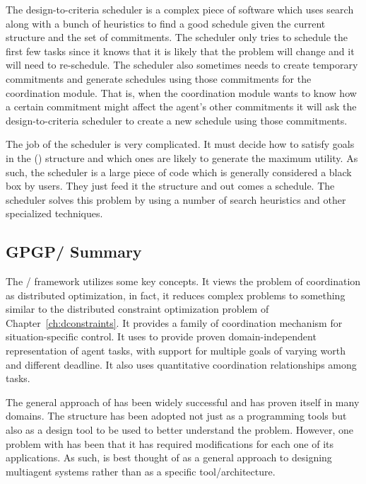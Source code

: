 The design-to-criteria scheduler is a complex piece of software which
uses search along with a bunch of heuristics to find a good schedule
given the current \taems{} structure and the set of commitments. The
scheduler only tries to schedule the first few tasks since it knows
that it is likely that the problem will change and it will need to
re-schedule. The scheduler also sometimes needs to create temporary
commitments and generate schedules using those commitments for the
 coordination module. That is, when the  coordination module
wants to know how a certain commitment might affect the agent's other
commitments it will ask the design-to-criteria scheduler to create a
new schedule using those commitments. 

The job of the scheduler is very complicated. It must decide how to
satisfy goals in the \taems() structure and which ones are likely to
generate the maximum utility. As such, the scheduler is a large piece
of code which is generally considered a black box by  users. They
just feed it the \taems{} structure and out comes a schedule. The
scheduler solves this problem by using a number of search heuristics
and other specialized techniques.

\subsection{GPGP/\taems{} Summary}

The /\taems{} framework utilizes some key concepts. It views the
problem of coordination as distributed optimization, in fact, it
reduces complex problems to something similar to the distributed
constraint optimization problem of Chapter~\ref{ch:dconstraints}. It
provides a family of coordination mechanism for situation-specific
control. It uses \taems{} to provide proven domain-independent
representation of agent tasks, with support for multiple goals of
varying worth and different deadline. It also uses quantitative
coordination relationships among tasks.

The general approach of  has been widely successful and has
proven itself in many domains. The \taems{} structure has been adopted
not just as a programming tools but also as a design tool to be used
to better understand the problem. However, one problem with  has
been that it has required modifications for each one of its
applications. As such,  is best thought of as a general approach
to designing multiagent systems rather than as a specific
tool/architecture.



